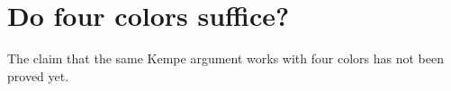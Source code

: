\section{Do four colors suffice?}\label{sec:four-color}
The claim that the same Kempe argument works with four colors has not been proved yet.
